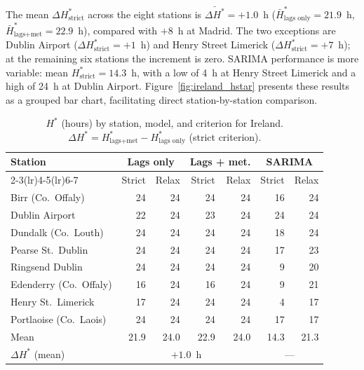\documentclass[12pt,a4paper]{article}
\begin{document}
The mean $\Delta H^*_{\text{strict}}$ across the eight stations is
$\bar{\Delta H^*} = +1.0$~h ($\bar{H}^*_{\text{lags only}} = 21.9$~h,
$\bar{H}^*_{\text{lags+met}} = 22.9$~h), compared with $+8$~h at Madrid.  The two
exceptions are Dublin Airport ($\Delta H^*_{\text{strict}} = +1$~h) and Henry
Street Limerick ($\Delta H^*_{\text{strict}} = +7$~h); at the remaining six
stations the increment is zero.  SARIMA performance is more variable: mean
$H^*_{\text{strict}} = 14.3$~h, with a low of 4~h at Henry Street Limerick and
a high of 24~h at Dublin Airport.  Figure~\ref{fig:ireland_hstar} presents
these results as a grouped bar chart, facilitating direct station-by-station
comparison.

\begin{table}[htbp]
\centering
\caption{$H^*$ (hours) by station, model, and criterion for Ireland.
  $\Delta H^* = H^*_{\text{lags+met}} - H^*_{\text{lags only}}$ (strict criterion).}
\label{tab:ireland_hstar}
\small
\begin{tabular}{lrrrrrr}
\toprule
Station &
\multicolumn{2}{c}{Lags only} &
\multicolumn{2}{c}{Lags + met.} &
\multicolumn{2}{c}{SARIMA} \\
\cmidrule(lr){2-3}\cmidrule(lr){4-5}\cmidrule(lr){6-7}
& Strict & Relax & Strict & Relax & Strict & Relax \\
\midrule
Birr (Co.\ Offaly)      & 24 & 24 & 24 & 24 & 16 & 24 \\
Dublin Airport          & 22 & 24 & 23 & 24 & 24 & 24 \\
Dundalk (Co.\ Louth)    & 24 & 24 & 24 & 24 & 18 & 24 \\
Pearse St.\ Dublin      & 24 & 24 & 24 & 24 & 17 & 23 \\
Ringsend Dublin         & 24 & 24 & 24 & 24 &  9 & 20 \\
Edenderry (Co.\ Offaly) & 16 & 24 & 16 & 24 &  9 & 21 \\
Henry St.\ Limerick     & 17 & 24 & 24 & 24 &  4 & 17 \\
Portlaoise (Co.\ Laois) & 24 & 24 & 24 & 24 & 17 & 17 \\
\midrule
Mean                    & 21.9 & 24.0 & 22.9 & 24.0 & 14.3 & 21.3 \\
$\Delta H^*$ (mean)     & \multicolumn{4}{c}{$+1.0$~h} & \multicolumn{2}{c}{---} \\
\bottomrule
\end{tabular}
\end{table}
\end{document}
